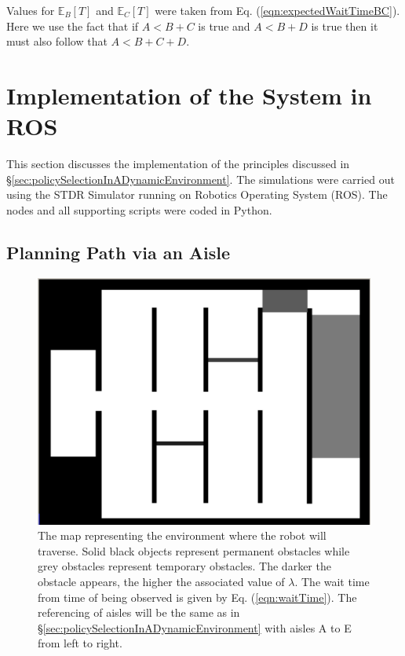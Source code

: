 \documentclass[a4paper,12pt]{article}
\begin{document}
			Values for $\mathbb{E}_{B}\left[T\right]$ and $\mathbb{E}_{C}\left[T\right]$ were taken from Eq. (\ref{eqn:expectedWaitTimeBC}). Here we use the fact that if $A<B+C$ is true and $A<B+D$ is true then it must also follow that $A<B+C+D$. 
	
	
	\newpage
	\section{Implementation of the System in ROS}
	\label{sec:implementationInROS}
		This section discusses the implementation of the principles discussed in \S \ref{sec:policySelectionInADynamicEnvironment}. The simulations were carried out using the STDR Simulator running on Robotics Operating System (ROS). The nodes and all supporting scripts were coded in Python. 
	
		\subsection{Planning Path via an Aisle}
		\label{sec:planningPathViaAisleROS}
		
		\begin{figure}[H]
			\centering
			\includegraphics[width=.5\textwidth]{images/stdr_map.png}
			\caption{The map representing the environment where the robot will traverse. Solid black objects represent permanent obstacles while grey obstacles represent temporary obstacles. The darker the obstacle appears, the higher the associated value of $\lambda$. The wait time from time of being observed is given by Eq. (\ref{eqn:waitTime}). The referencing of aisles will be the same as in \S \ref{sec:policySelectionInADynamicEnvironment} with aisles A to E from left to right.}
			\label{fig:stdrMap}
		\end{figure}
		
\end{document}
